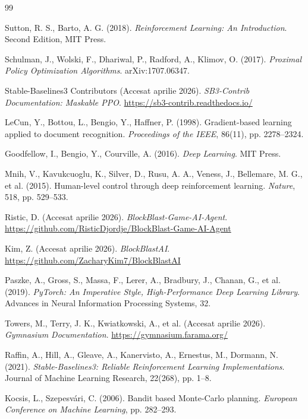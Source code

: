 \documentclass[12pt,a4paper]{article}
\begin{document}
\newpage
\begin{thebibliography}{99}

Sutton, R. S., Barto, A. G. (2018).
\textit{Reinforcement Learning: An Introduction}.
Second Edition, MIT Press.

Schulman, J., Wolski, F., Dhariwal, P., Radford, A., Klimov, O. (2017).
\textit{Proximal Policy Optimization Algorithms}.
arXiv:1707.06347.

Stable-Baselines3 Contributors (Accesat aprilie 2026).
\textit{SB3-Contrib Documentation: Maskable PPO}.
\url{https://sb3-contrib.readthedocs.io/}

LeCun, Y., Bottou, L., Bengio, Y., Haffner, P. (1998).
Gradient-based learning applied to document recognition.
\textit{Proceedings of the IEEE}, 86(11), pp. 2278--2324.

Goodfellow, I., Bengio, Y., Courville, A. (2016).
\textit{Deep Learning}.
MIT Press.

Mnih, V., Kavukcuoglu, K., Silver, D., Rusu, A. A., Veness, J., Bellemare, M. G., et al. (2015).
Human-level control through deep reinforcement learning.
\textit{Nature}, 518, pp. 529--533.

Ristic, D. (Accesat aprilie 2026).
\textit{BlockBlast-Game-AI-Agent}.
\url{https://github.com/RisticDjordje/BlockBlast-Game-AI-Agent}

Kim, Z. (Accesat aprilie 2026).
\textit{BlockBlastAI}.
\url{https://github.com/ZacharyKim7/BlockBlastAI}

Paszke, A., Gross, S., Massa, F., Lerer, A., Bradbury, J., Chanan, G., et al. (2019).
\textit{PyTorch: An Imperative Style, High-Performance Deep Learning Library}.
Advances in Neural Information Processing Systems, 32.

Towers, M., Terry, J. K., Kwiatkowski, A., et al. (Accesat aprilie 2026).
\textit{Gymnasium Documentation}.
\url{https://gymnasium.farama.org/}

Raffin, A., Hill, A., Gleave, A., Kanervisto, A., Ernestus, M., Dormann, N. (2021).
\textit{Stable-Baselines3: Reliable Reinforcement Learning Implementations}.
Journal of Machine Learning Research, 22(268), pp. 1--8.

Kocsis, L., Szepesvári, C. (2006).
Bandit based Monte-Carlo planning.
\textit{European Conference on Machine Learning}, pp. 282--293.

\end{thebibliography}
\end{document}

